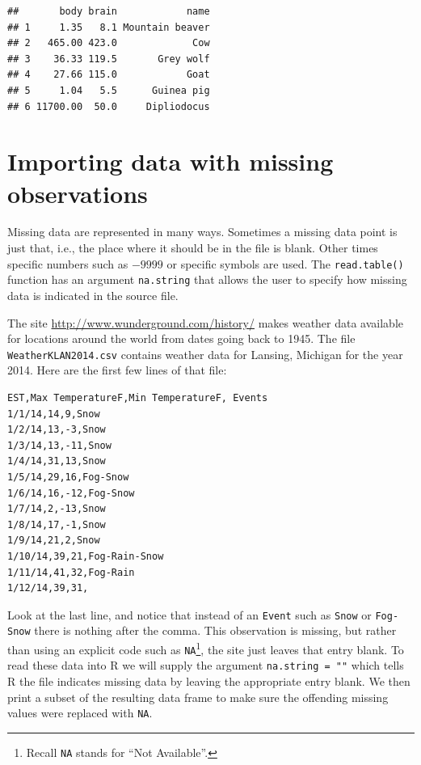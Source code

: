 \documentclass[
]{krantz}
\begin{document}
\begin{verbatim}
##       body brain            name
## 1     1.35   8.1 Mountain beaver
## 2   465.00 423.0             Cow
## 3    36.33 119.5       Grey wolf
## 4    27.66 115.0            Goat
## 5     1.04   5.5      Guinea pig
## 6 11700.00  50.0     Dipliodocus
\end{verbatim}

\hypertarget{importing-data-with-missing-observations}{%
\section{Importing data with missing observations}\label{importing-data-with-missing-observations}}

Missing data are represented in many ways. Sometimes a missing data point is just that, i.e., the place where it should be in the file is blank. Other times specific numbers such as \(-9999\) or specific symbols are used. The \texttt{read.table()} function has an argument \texttt{na.string} that allows the user to specify how missing data is indicated in the source file.

The site \url{http://www.wunderground.com/history/} makes weather data available for locations around the world from dates going back to 1945. The file \texttt{WeatherKLAN2014.csv} contains weather data for Lansing, Michigan for the year 2014. Here are the first few lines of that file:

\begin{verbatim}
EST,Max TemperatureF,Min TemperatureF, Events
1/1/14,14,9,Snow
1/2/14,13,-3,Snow
1/3/14,13,-11,Snow
1/4/14,31,13,Snow
1/5/14,29,16,Fog-Snow
1/6/14,16,-12,Fog-Snow
1/7/14,2,-13,Snow
1/8/14,17,-1,Snow
1/9/14,21,2,Snow
1/10/14,39,21,Fog-Rain-Snow
1/11/14,41,32,Fog-Rain
1/12/14,39,31,
\end{verbatim}

Look at the last line, and notice that instead of an \texttt{Event} such as \texttt{Snow} or \texttt{Fog-Snow} there is nothing after the comma. This observation is missing, but rather than using an explicit code such as \texttt{NA}\footnote{Recall \texttt{NA} stands for ``Not Available''.}, the site just leaves that entry blank. To read these data into R we will supply the argument \texttt{na.string\ =\ ""} which tells R the file indicates missing data by leaving the appropriate entry blank. We then print a subset of the resulting data frame to make sure the offending missing values were replaced with \texttt{NA}.
\end{document}
